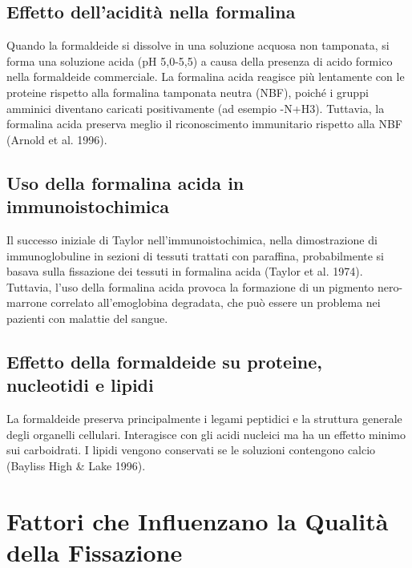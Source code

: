 \subsection{Effetto dell'acidità nella formalina}
Quando la formaldeide si dissolve in una soluzione acquosa non tamponata, si forma una soluzione acida (pH 5,0-5,5) a causa della presenza di acido formico nella formaldeide commerciale. La formalina acida reagisce più lentamente con le proteine rispetto alla formalina tamponata neutra (NBF), poiché i gruppi amminici diventano caricati positivamente (ad esempio -N+H3). Tuttavia, la formalina acida preserva meglio il riconoscimento immunitario rispetto alla NBF (Arnold et al. 1996).

\subsection{Uso della formalina acida in immunoistochimica}
Il successo iniziale di Taylor nell'immunoistochimica, nella dimostrazione di immunoglobuline in sezioni di tessuti trattati con paraffina, probabilmente si basava sulla fissazione dei tessuti in formalina acida (Taylor et al. 1974). Tuttavia, l'uso della formalina acida provoca la formazione di un pigmento nero-marrone correlato all'emoglobina degradata, che può essere un problema nei pazienti con malattie del sangue.

\subsection{Effetto della formaldeide su proteine, nucleotidi e lipidi}
La formaldeide preserva principalmente i legami peptidici e la struttura generale degli organelli cellulari. Interagisce con gli acidi nucleici ma ha un effetto minimo sui carboidrati. I lipidi vengono conservati se le soluzioni contengono calcio (Bayliss High \& Lake 1996).


\section{Fattori che Influenzano la Qualità della Fissazione}

